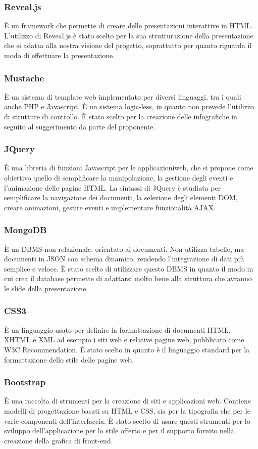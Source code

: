 \subsubsection{Reveal.js}
È un framework che permette di creare delle presentazioni interattive in HTML.
L'utilizzo di Reveal.js è stato scelto per la sua strutturazione della presentazione che si adatta alla nostra visione del progetto, soprattutto per quanto riguarda il modo di effettuare la presentazione.

\subsubsection{Mustache}
È un sistema di template web implementato per diversi linguaggi, tra i quali anche PHP e Javascript. È un sistema logic-less, in quanto non prevede l'utilizzo di strutture di controllo.
È stato scelto per la creazione delle infografiche in seguito al suggerimento da parte del proponente.

\subsubsection{JQuery}
È una libreria di funzioni Javascript per le applicazioniweb, che si propone come obiettivo quello di semplificare la manipolazione, la gestione degli eventi e l'animazione delle pagine HTML. La sintassi di JQuery è studiata per semplificare la navigazione dei documenti, la selezione degli elementi DOM, creare animazioni, gestire eventi e implementare funzionalità AJAX.

\subsubsection{MongoDB}
È un DBMS non relazionale, orientato ai documenti. Non utilizza tabelle, ma documenti in JSON con schema dinamico, rendendo l'integrazione di dati più semplice e veloce.
È stato scelto di utilizzare questo DBMS in quanto il modo in cui crea il database permette di adattarsi molto bene alla struttura che avranno le slide della presentazione.

\subsubsection{CSS3}
È un linguaggio usato per definire la formattazione di documenti HTML, XHTML e XML ad esempio i siti web e relative pagine web, pubblicato come W3C Recommendation.
È stato scelto in quanto è il linguaggio standard per la formattazione dello stile delle pagine web.

\subsubsection{Bootstrap}
È una raccolta di strumenti per la creazione di siti e applicazioni web. Contiene modelli di progettazione basati su HTML e CSS, sia per la tipografia che per le varie componenti dell'interfaccia.
È stato scelto di usare questi strumenti per lo sviluppo dell'applicazione per lo stile offerto e per il supporto fornito nella creazione della grafica di front-end.